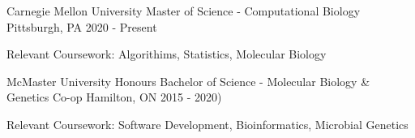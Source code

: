 \begin{cventries}
   \cventry
       {Carnegie Mellon University}
       {Master of Science - Computational Biology}
       {Pittsburgh, PA} %
       {2020 - Present}
       {
         \begin{cvitems}
          \item{Relevant Coursework: Algorithims, Statistics, Molecular Biology}
        \end{cvitems}
       }
   \cventry
       {McMaster University}
       {Honours Bachelor of Science - Molecular Biology \& Genetics Co-op}
       {Hamilton, ON} %
       {2015 - 2020)}
       {
         \begin{cvitems}
          \item{Relevant Coursework: Software Development, Bioinformatics, Microbial Genetics}
        \end{cvitems}
       }
\end{cventries}

